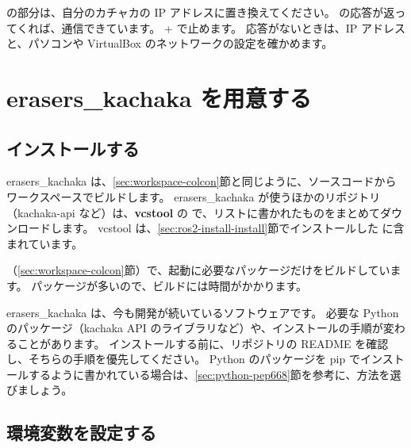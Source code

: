  の部分は、自分のカチャカの IP アドレスに置き換えてください。
 の応答が返ってくれば、通信できています。
+ で止めます。
応答がないときは、IP アドレスと、パソコンや VirtualBox のネットワークの設定を確かめます。

\section{erasers\_kachaka を用意する}
\label{sec:kachaka-setup}

\subsection{インストールする}

erasers\_kachaka は、\ref{sec:workspace-colcon}節と同じように、ソースコードからワークスペースでビルドします。
erasers\_kachaka が使うほかのリポジトリ（kachaka-api など）は、\textbf{vcstool} の  で、リストに書かれたものをまとめてダウンロードします。
vcstool は、\ref{sec:ros2-install-install}節でインストールした  に含まれています。


（\ref{sec:workspace-colcon}節）で、起動に必要なパッケージだけをビルドしています。
パッケージが多いので、ビルドには時間がかかります。

\begin{caution}[最新の手順を確かめる]
  erasers\_kachaka は、今も開発が続いているソフトウェアです。
  必要な Python のパッケージ（kachaka API のライブラリなど）や、インストールの手順が変わることがあります。
  インストールする前に、リポジトリの README を確認し、そちらの手順を優先してください。
  Python のパッケージを pip でインストールするように書かれている場合は、\ref{sec:python-pep668}節を参考に、方法を選びましょう。
\end{caution}

\subsection{環境変数を設定する}

